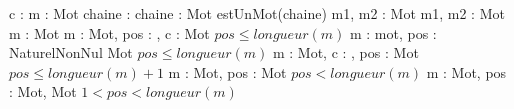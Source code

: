 \begin{algorithme}
		{c : \caractere}%
		{\booleen}
		{m : Mot}%
		{\naturelNonNul}
		{chaine : \chaine}%
		{\booleen}
		{chaine : \chaine}%
		{Mot}%
		{estUnMot(chaine)}
		{m1, m2 : Mot}%
		{\booleen}
		{m1, m2 : Mot}%
		{\booleen}
		{m : Mot}%
		{\chaine}
		{m : Mot, pos : \naturelNonNul, c : \caractere}%
		{Mot}%
		{$pos \leq longueur(m)$}
		{m : mot, pos : NaturelNonNul}%
		{Mot}%
		{$pos \leq longueur(m)$}
		{m : Mot, c : \caractere, pos : \naturelNonNul}%
		{Mot}%
		{$pos \leq longueur(m) + 1$}
		{m : Mot, pos : \naturelNonNul}%
		{Mot}%
		{$pos < longueur(m)$}
		{m : Mot, pos : \naturelNonNul}%
		{Mot, Mot}%
		{$1 < pos < longueur(m)$}
\end{algorithme}
